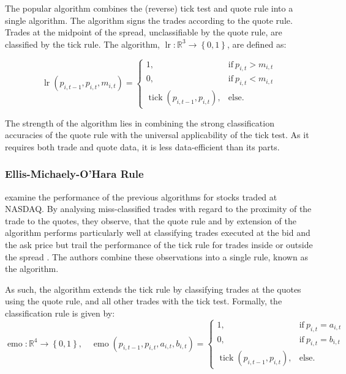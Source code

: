 The popular  algorithm \autocite{leeInferringTradeDirection1991} combines the (reverse) tick test and quote rule into a single algorithm. The algorithm signs the trades according to the quote rule. Trades at the midpoint of the spread, unclassifiable by the quote rule, are classified by the tick rule. The  algorithm, $\operatorname{lr} \colon \mathbb{R}^3 \to \left\{0,1\right\}$, are defined as:

\begin{equation}
  \operatorname{lr}(p_{i,t-1}, p_{i,t}, m_{i,t})=
  \begin{cases}
    1,                                       & \text{if}\ p_{i, t} > m_{i, t} \\
    0,                                       & \text{if}\ p_{i, t} < m_{i, t} \\
    \operatorname{tick}(p_{i,t-1}, p_{i,t}), & \text{else}.
  \end{cases}
\end{equation}

The strength of the algorithm lies in combining the strong classification accuracies of the quote rule with the universal applicability of the tick test. As it requires both trade and quote data, it is less data-efficient than its parts.


\subsubsection{Ellis-Michaely-O'Hara
  Rule}\label{sec:ellis-michaely-ohara-rule}

\textcite[][536]{ellisAccuracyTradeClassification2000} examine the performance of the previous algorithms for stocks traded at NASDAQ. By analysing miss-classified trades with regard to the proximity of the trade to the quotes, they observe, that the quote rule and by extension of the  algorithm performs particularly well at classifying trades executed at the bid and the ask price but trail the performance of the tick rule for trades inside or outside the spread \autocite[][535--536]{ellisAccuracyTradeClassification2000}. The authors combine these observations into a single rule, known as the  algorithm.

As such, the  algorithm extends the tick rule by classifying trades at the quotes using the quote rule, and all other trades with the tick test. Formally, the classification rule is given by:
\begin{equation}
  \operatorname{emo} \colon \mathbb{R}^4 \to \left\{0, 1 \right\}, \quad
  \operatorname{emo}(p_{i, t-1}, p_{i, t}, a_{i, t}, b_{i, t})=
  \begin{cases}
    1,                                         & \text{if}\ p_{i, t} = a_{i, t} \\
    0,                                         & \text{if}\ p_{i, t} = b_{i, t} \\
    \operatorname{tick}(p_{i, t-1}, p_{i, t}), & \text{else}.
  \end{cases}
  \label{eq:emo-rule}
\end{equation}


